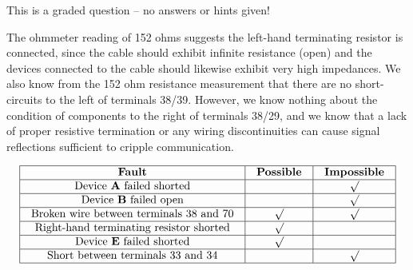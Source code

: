 \vfil

\eject






This is a graded question -- no answers or hints given!







The ohmmeter reading of 152 ohms suggests the left-hand terminating resistor is connected, since the cable should exhibit infinite resistance (open) and the devices connected to the cable should likewise exhibit very high impedances.  We also know from the 152 ohm resistance measurement that there are no short-circuits to the left of terminals 38/39.  However, we know nothing about the condition of components to the right of terminals 38/29, and we know that a lack of proper resistive termination or any wiring discontinuities can cause signal reflections sufficient to cripple communication.


$$\vbox{\offinterlineskip
\halign{\strut
\vrule \quad\hfil # \ \hfil & 
\vrule \quad\hfil # \ \hfil & 
\vrule \quad\hfil # \ \hfil \vrule \cr
\noalign{\hrule}
%
{\bf Fault} & {\bf Possible} & {\bf Impossible} \cr
%
\noalign{\hrule}
%
Device {\bf A} failed shorted &  & $\surd$ \cr
%
\noalign{\hrule}
%
Device {\bf B} failed open &  & $\surd$ \cr
%
\noalign{\hrule}
%
Broken wire between terminals 38 and 70 & $\surd$ & $\surd$ \cr
%
\noalign{\hrule}
%
Right-hand terminating resistor shorted & $\surd$ &  \cr
%
\noalign{\hrule}
%
Device {\bf E} failed shorted & $\surd$ &  \cr
%
\noalign{\hrule}
%
Short between terminals 33 and 34 &  & $\surd$ \cr
%
\noalign{\hrule}
} %
}$$ %





